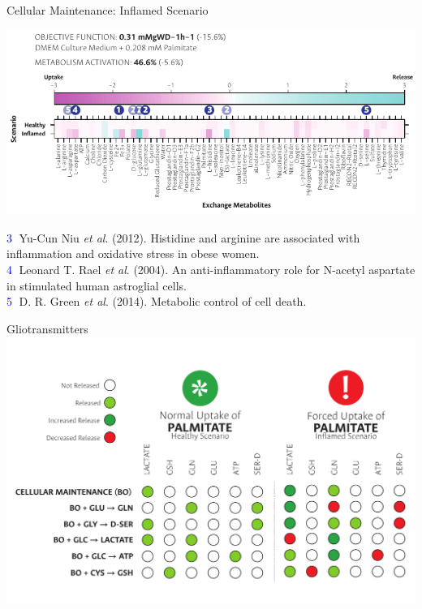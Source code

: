 \documentclass[11pt]{beamer}
\begin{document}
\begin{frame}{Cellular Maintenance: Inflamed Scenario}
\begin{center}
\includegraphics[width=\textwidth]{I-results}\\
\end{center}
\textcolor{blue}{\textcircled{{\tiny 3}}} {\tiny Yu-Cun Niu \textit{et al}. (2012). Histidine and arginine are associated with inflammation and oxidative stress in obese women. \vspace{0.1cm}\\}
\textcolor{blue}{\textcircled{{\tiny 4}}} {\tiny Leonard T. Rael \textit{et al}. (2004). An anti-inflammatory role for N-acetyl aspartate in stimulated human astroglial cells.\vspace{0.1cm}\\}
\textcolor{blue}{\textcircled{{\tiny 5}}} {\tiny D. R. Green \textit{et al}. (2014). Metabolic control of cell death.  \vspace{0.1cm}\\}
\end{frame}
\begin{frame}{Gliotransmitters}
\includegraphics[width=\textwidth]{GTi}
\end{frame}
\end{document}

